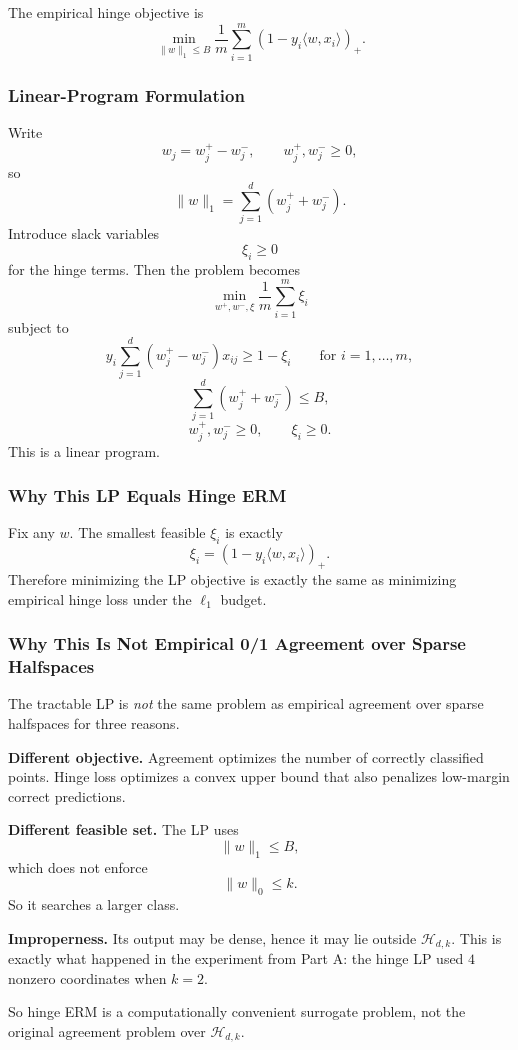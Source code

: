 \documentclass{article}
\newcommand{\cH}{\mathcal{H}}
\begin{document}
The empirical hinge objective is
$$
\min_{\|w\|_1\le B}
\frac1m \sum_{i=1}^m (1-y_i\langle w,x_i\rangle)_+.
$$

\subsubsection{Linear-Program Formulation}

Write
$$
w_j = w_j^+ - w_j^-,
\qquad
w_j^+,w_j^- \ge 0,
$$
so
$$
\|w\|_1 = \sum_{j=1}^d (w_j^+ + w_j^-).
$$
Introduce slack variables
$$
\xi_i \ge 0
$$
for the hinge terms. Then the problem becomes
$$
\min_{w^+,w^-,\xi}
\frac1m \sum_{i=1}^m \xi_i
$$
subject to
$$
y_i\sum_{j=1}^d (w_j^+ - w_j^-)x_{ij} \ge 1-\xi_i
\qquad
\text{for } i=1,\dots,m,
$$
$$
\sum_{j=1}^d (w_j^+ + w_j^-)\le B,
$$
$$
w_j^+,w_j^- \ge 0,
\qquad
\xi_i \ge 0.
$$
This is a linear program.

\subsubsection{Why This LP Equals Hinge ERM}

Fix any $w$. The smallest feasible $\xi_i$ is exactly
$$
\xi_i = (1-y_i\langle w,x_i\rangle)_+.
$$
Therefore minimizing the LP objective is exactly the same as minimizing empirical hinge loss under the $\ell_1$ budget.

\subsubsection{Why This Is Not Empirical 0/1 Agreement over Sparse Halfspaces}

The tractable LP is \emph{not} the same problem as empirical agreement over sparse halfspaces for three reasons.

\textbf{Different objective.}
Agreement optimizes the number of correctly classified points. Hinge loss optimizes a convex upper bound that also penalizes low-margin correct predictions.

\textbf{Different feasible set.}
The LP uses
$$
\|w\|_1\le B,
$$
which does not enforce
$$
\|w\|_0\le k.
$$
So it searches a larger class.

\textbf{Improperness.}
Its output may be dense, hence it may lie outside $\cH_{d,k}$. This is exactly what happened in the experiment from Part A: the hinge LP used $4$ nonzero coordinates when $k=2$.

So hinge ERM is a computationally convenient surrogate problem, not the original agreement problem over $\cH_{d,k}$.
\end{document}
